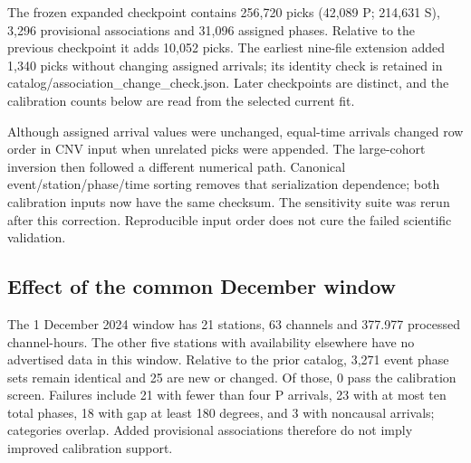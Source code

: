 The frozen expanded checkpoint contains 256,720 picks (42,089 P; 214,631 S), 3,296 provisional associations and 31,096 assigned phases. Relative to the previous checkpoint it adds 10,052 picks. The earliest nine-file extension added 1,340 picks without changing assigned arrivals; its identity check is retained in catalog/association\_change\_check.json. Later checkpoints are distinct, and the calibration counts below are read from the selected current fit.

\par{\footnotesize{}}

\par{\footnotesize{}}

Although assigned arrival values were unchanged, equal-time arrivals changed row order in CNV input when unrelated picks were appended. The large-cohort inversion then followed a different numerical path. Canonical event/station/phase/time sorting removes that serialization dependence; both calibration inputs now have the same checksum. The sensitivity suite was rerun after this correction. Reproducible input order does not cure the failed scientific validation.

\par{\footnotesize{}}

\subsection*{Effect of the common December window}

The 1 December 2024 window has 21 stations, 63 channels and 377.977 processed channel-hours. The other five stations with availability elsewhere have no advertised data in this window. Relative to the prior catalog, 3,271 event phase sets remain identical and 25 are new or changed. Of those, 0 pass the calibration screen. Failures include 21 with fewer than four P arrivals, 23 with at most ten total phases, 18 with gap at least 180 degrees, and 3 with noncausal arrivals; categories overlap. Added provisional associations therefore do not imply improved calibration support.

\par{\footnotesize{}}

\par{\footnotesize{}}

